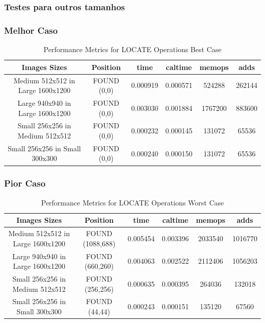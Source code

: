 \documentclass{report}
\begin{document}
\vspace{-10mm}

\subsubsection{Testes para outros tamanhos}

\subsubsection{Melhor Caso}


\begin{table}[h]
    \centering
    \begin{tabular}{cccccc}
        \toprule
        \textbf{Images Sizes} & \textbf{Position} & \textbf{time} & \textbf{caltime} & \textbf{memops} & \textbf{adds}\\
        \midrule
        Medium 512x512 in Large 1600x1200 & FOUND (0,0) & 0.000919 & 0.000571 & 524288 & 262144 \\
        Large 940x940 in Large 1600x1200 & FOUND (0,0) & 0.003030 & 0.001884 & 1767200 & 883600 \\
        Small 256x256 in Medium 512x512 & FOUND (0,0) & 0.000232 & 0.000145 & 131072 & 65536 \\
        Small 256x256 in Small 300x300 & FOUND (0,0) & 0.000240 & 0.000150 & 131072 & 65536 \\
        \bottomrule
    \end{tabular}
    \caption{Performance Metrics for LOCATE Operations Best Case}
\end{table}

\newpage


\subsubsection{Pior Caso}


\begin{table}[h]
    \centering
    \begin{tabular}{cccccc}
        \toprule
        \textbf{Images Sizes} & \textbf{Position} & \textbf{time} & \textbf{caltime} & \textbf{memops} & \textbf{adds}\\
        \midrule
        Medium 512x512 in Large 1600x1200 & FOUND (1088,688) & 0.005454 & 0.003396 & 2033540 & 1016770 \\
        Large 940x940 in Large 1600x1200 & FOUND (660,260) & 0.004063 & 0.002522 & 2112406 & 1056203 \\
        Small 256x256 in Medium 512x512 & FOUND (256,256) & 0.000635 & 0.000395 & 264036 & 132018 \\
        Small 256x256 in Small 300x300 & FOUND (44,44) & 0.000243 & 0.000151 & 135120 & 67560 \\
        \bottomrule
    \end{tabular}
    \caption{Performance Metrics for LOCATE Operations Worst Case}
\end{table}
\end{document}
